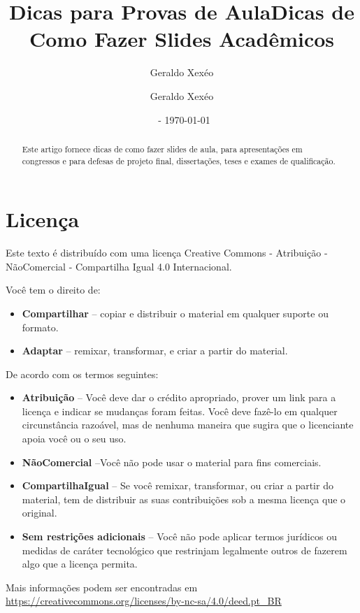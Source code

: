 \documentclass[12pt,a4paper]{article}
\title{Dicas para Provas de Aula}
\author{Geraldo Xexéo}
\affil{\url{xexeo@ufrj.br} \\
    \url{http://xexeo.net}}
\date{\ccbyncsa\  - \today}
\author{Geraldo Xexéo}
\title{Dicas de Como Fazer Slides Acadêmicos}
\begin{document}
\maketitle

\begin{abstract}
    Este artigo fornece dicas de como fazer slides de aula, para apresentações em congressos e para defesas de projeto final, dissertações, teses e exames de qualificação.
\end{abstract}

\tableofcontents














\section*{Licença}


Este texto é distribuído com uma licença Creative Commons - Atribuição - NãoComercial - Compartilha Igual 4.0 Internacional.




\begin{center}
   \ccbyncsa
\end{center}

Você tem o direito de:
\begin{itemize}
    \item \textbf{Compartilhar} -- copiar e distribuir o material em qualquer suporte ou formato.
    \item \textbf{Adaptar} -- remixar, transformar, e criar a partir do material.
\end{itemize}

De acordo com os termos seguintes:
\begin{itemize}
    \item \textbf{Atribuição} -- Você deve dar o crédito apropriado, prover um link para a licença e indicar se mudanças foram feitas. Você deve fazê-lo em qualquer circunstância razoável, mas de nenhuma maneira que sugira que o licenciante apoia você ou o seu uso.
    \item \textbf{NãoComercial} --Você não pode usar o material para fins comerciais.
    \item \textbf{CompartilhaIgual} -- Se você remixar, transformar, ou criar a partir do material, tem de distribuir as suas contribuições sob a mesma licença que o original.
    \item \textbf{Sem restrições adicionais} -- Você não pode aplicar termos jurídicos ou medidas de caráter tecnológico que restrinjam legalmente outros de fazerem algo que a licença permita.
\end{itemize}

Mais informações podem ser encontradas em \url{https://creativecommons.org/licenses/by-nc-sa/4.0/deed.pt_BR}
\end{document}

